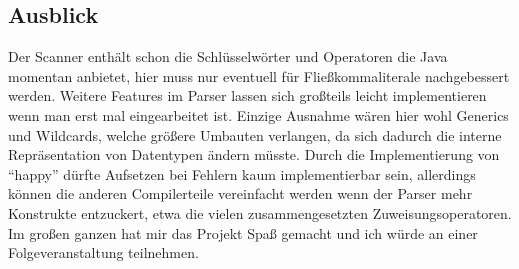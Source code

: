 \documentclass{article}
\begin{document}
  \subsection{Ausblick}
  Der Scanner enthält schon die Schlüsselwörter und Operatoren die Java momentan anbietet, hier muss nur eventuell für Fließkommaliterale nachgebessert werden. Weitere Features im Parser lassen sich großteils leicht implementieren wenn man erst mal eingearbeitet ist. Einzige Ausnahme wären hier wohl Generics und Wildcards, welche größere Umbauten verlangen, da sich dadurch die interne Repräsentation von Datentypen ändern müsste. Durch die Implementierung von ``happy'' dürfte Aufsetzen bei Fehlern kaum implementierbar sein, allerdings können die anderen Compilerteile vereinfacht werden wenn der Parser mehr Konstrukte entzuckert, etwa die vielen zusammengesetzten Zuweisungsoperatoren. Im großen ganzen hat mir das Projekt Spaß gemacht und ich würde an einer Folgeveranstaltung teilnehmen. 
\end{document}
